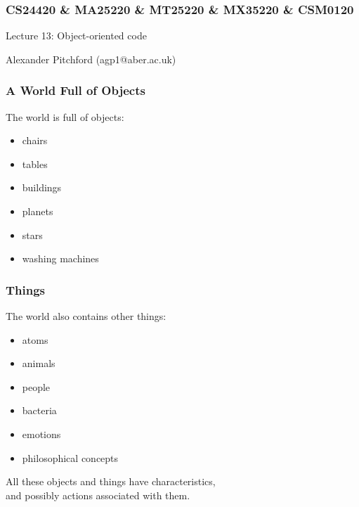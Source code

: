 \documentclass{beamer}
\begin{document}

\begin{frame}
\frametitle{CS24420 \& MA25220 \& MT25220 \& MX35220 \& CSM0120}

\begin{center}
\begin{huge}
Lecture 13: Object-oriented code 
\end{huge}
\bigskip

Alexander Pitchford (agp1@aber.ac.uk)

\end{center}
\end{frame}

\begin{frame}[fragile]
\frametitle{A World Full of Objects}
The world is full of objects:
\begin{itemize}
\item chairs
\item tables
\item buildings
\item planets
\item stars
\item washing machines
\end{itemize}

\end{frame}

\begin{frame}[fragile]
\frametitle{Things}
The world also contains other things:
\begin{itemize}
\item atoms
\item animals
\item people
\item bacteria
\item emotions
\item philosophical concepts
\end{itemize}
\pause
\bigskip
All these objects and things have characteristics,\\
\smallskip
\pause
and possibly actions associated with them.
\bigskip

\end{frame}
\end{document}
